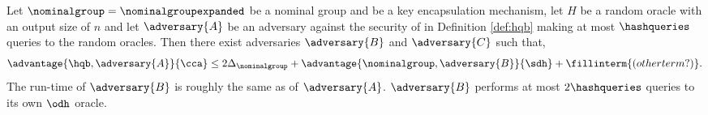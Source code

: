 \begin{theorem}
    \label{theorem:sdh_kem-coll_imply_hqb}
    Let $\nominalgroup = \nominalgroupexpanded$ be a nominal group and \kem be a key encapsulation mechanism, let $H$ be a random oracle with an output size of $n$ and let $\adversary{A}$ be an adversary against the \cca security of \hqb in Definition \ref{def:hqb} making at most $\hashqueries$ queries to the random oracles.
    Then there exist adversaries $\adversary{B}$ and $\adversary{C}$ such that,
    \[ \advantage{\hqb, \adversary{A}}{\cca} \leq 2 \Delta_\nominalgroup +  \advantage{\nominalgroup, \adversary{B}}{\sdh} + \fillinterm{(other term?)}. \]
    The run-time of $\adversary{B}$ is roughly the same as of $\adversary{A}$.
    $\adversary{B}$ performs at most $2 \hashqueries$ queries to its own $\odh$ oracle.
\end{theorem}


